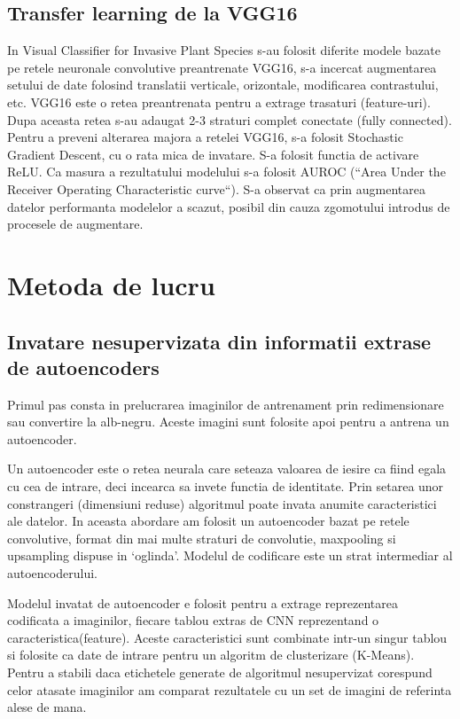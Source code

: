 \documentclass{article}
\begin{document}
\subsection{Transfer learning de la VGG16}
In Visual Classifier for Invasive Plant Species\cite{ARTICLE:4} s-au folosit diferite modele bazate pe retele neuronale convolutive preantrenate VGG16, s-a incercat augmentarea setului de date folosind translatii verticale, orizontale, modificarea contrastului, etc. VGG16 este o retea preantrenata pentru a extrage trasaturi (feature-uri). Dupa aceasta retea s-au adaugat 2-3 straturi complet conectate (fully connected). Pentru a preveni alterarea majora a retelei VGG16, s-a folosit Stochastic Gradient Descent, cu o rata mica de invatare. S-a folosit functia de activare ReLU. Ca masura a rezultatului modelului s-a folosit AUROC (“Area Under the Receiver Operating Characteristic curve“). S-a observat ca prin augmentarea datelor performanta modelelor a scazut, posibil din cauza zgomotului introdus de procesele de augmentare.

\section{Metoda de lucru}

\subsection{Invatare nesupervizata din informatii extrase de autoencoders}
Primul pas consta in prelucrarea imaginilor de antrenament prin redimensionare sau convertire la alb-negru. Aceste imagini sunt folosite apoi pentru a antrena un autoencoder.

Un autoencoder este o retea neurala care seteaza valoarea de iesire ca fiind egala cu cea de intrare, deci incearca sa invete functia de identitate. Prin setarea unor constrangeri (dimensiuni reduse) algoritmul poate invata anumite caracteristici ale datelor\cite{BOOK:2}. In aceasta abordare am folosit un autoencoder bazat pe retele convolutive, format din mai multe straturi de convolutie, maxpooling si upsampling dispuse in ‘oglinda’. Modelul de codificare este un strat intermediar al autoencoderului.

Modelul invatat de autoencoder e folosit pentru a extrage reprezentarea codificata a imaginilor, fiecare tablou extras de CNN reprezentand o caracteristica(feature). Aceste caracteristici sunt combinate intr-un singur tablou si folosite ca date de intrare pentru un algoritm de clusterizare (K-Means). Pentru a stabili daca etichetele generate de algoritmul nesupervizat corespund celor atasate imaginilor am comparat rezultatele cu un set de imagini de referinta alese de mana.
\end{document}
